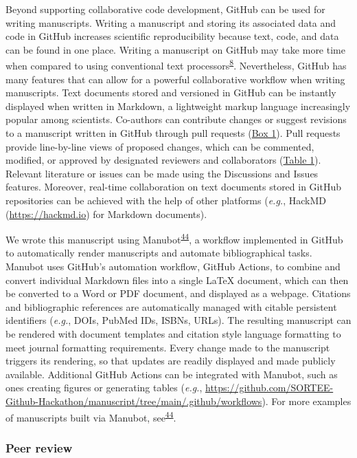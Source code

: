 Beyond supporting collaborative code development, GitHub can be used for writing manuscripts.
Writing a manuscript and storing its associated data and code in GitHub increases scientific reproducibility because text, code, and data can be found in one place.
Writing a manuscript on GitHub may take more time when compared to using conventional text processors\textsuperscript{\protect\hyperlink{ref-4ny1onB0}{8}}.
Nevertheless, GitHub has many features that can allow for a powerful collaborative workflow when writing manuscripts.
Text documents stored and versioned in GitHub can be instantly displayed when written in Markdown, a lightweight markup language increasingly popular among scientists.
Co-authors can contribute changes or suggest revisions to a manuscript written in GitHub through pull requests (\protect\hyperlink{definitions}{Box 1}).
Pull requests provide line-by-line views of proposed changes, which can be commented, modified, or approved by designated reviewers and collaborators (\protect\hyperlink{tbl:roles}{Table 1}).
Relevant literature or issues can be made using the Discussions and Issues features.
Moreover, real-time collaboration on text documents stored in GitHub repositories can be achieved with the help of other platforms (\emph{e.g.}, HackMD (\url{https://hackmd.io}) for Markdown documents).

We wrote this manuscript using Manubot\textsuperscript{\protect\hyperlink{ref-YuJbg3zO}{44}}, a workflow implemented in GitHub to automatically render manuscripts and automate bibliographical tasks.
Manubot uses GitHub's automation workflow, GitHub Actions, to combine and convert individual Markdown files into a single LaTeX document, which can then be converted to a Word or PDF document, and displayed as a webpage.
Citations and bibliographic references are automatically managed with citable persistent identifiers (\emph{e.g.}, DOIs, PubMed IDs, ISBNs, URLs).
The resulting manuscript can be rendered with document templates and citation style language formatting to meet journal formatting requirements.
Every change made to the manuscript triggers its rendering, so that updates are readily displayed and made publicly available.
Additional GitHub Actions can be integrated with Manubot, such as ones creating figures or generating tables (\emph{e.g.}, \url{https://github.com/SORTEE-Github-Hackathon/manuscript/tree/main/.github/workflows}).
For more examples of manuscripts built via Manubot, see\textsuperscript{\protect\hyperlink{ref-YuJbg3zO}{44}}.

\hypertarget{peer-review}{%
\subsubsection{Peer review}\label{peer-review}}

